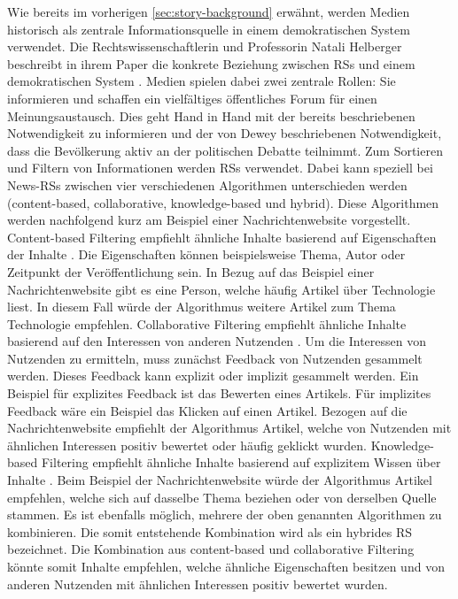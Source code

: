 Wie bereits im vorherigen \autoref{sec:story-background} erwähnt, werden Medien historisch als zentrale Informationsquelle in einem demokratischen System verwendet.
Die Rechtswissenschaftlerin und Professorin Natali Helberger beschreibt in ihrem Paper die konkrete Beziehung zwischen \acp{RS} und einem demokratischen System \cite{democratic-role}.
Medien spielen dabei zwei zentrale Rollen: Sie informieren und schaffen ein vielfältiges öffentliches Forum für einen Meinungsaustausch.
Dies geht Hand in Hand mit der bereits beschriebenen Notwendigkeit zu informieren und der von Dewey beschriebenen Notwendigkeit, dass die Bevölkerung aktiv an der politischen Debatte teilnimmt.
Zum Sortieren und Filtern von Informationen werden \acp{RS} verwendet.
Dabei kann speziell bei News-\acp{RS} zwischen vier verschiedenen Algorithmen unterschieden werden (content-based, collaborative, knowledge-based und hybrid).
Diese Algorithmen werden nachfolgend kurz am Beispiel einer Nachrichtenwebsite vorgestellt. \\

Content-based Filtering empfiehlt ähnliche Inhalte basierend auf Eigenschaften der Inhalte \cite{content-based-rs}.
Die Eigenschaften können beispielsweise Thema, Autor oder Zeitpunkt der Veröffentlichung sein.
In Bezug auf das Beispiel einer Nachrichtenwebsite gibt es eine Person, welche häufig Artikel über Technologie liest.
In diesem Fall würde der Algorithmus weitere Artikel zum Thema Technologie empfehlen.
Collaborative Filtering empfiehlt ähnliche Inhalte basierend auf den Interessen von anderen Nutzenden \cite{collaborative-filtering-rs}.
Um die Interessen von Nutzenden zu ermitteln, muss zunächst Feedback von Nutzenden gesammelt werden.
Dieses Feedback kann explizit oder implizit gesammelt werden.
Ein Beispiel für explizites Feedback ist das Bewerten eines Artikels.
Für implizites Feedback wäre ein Beispiel das Klicken auf einen Artikel.
Bezogen auf die Nachrichtenwebsite empfiehlt der Algorithmus Artikel, welche von Nutzenden mit ähnlichen Interessen positiv bewertet oder häufig geklickt wurden.
Knowledge-based Filtering empfiehlt ähnliche Inhalte basierend auf explizitem Wissen über Inhalte \cite{knowledge-based-rs}.
Beim Beispiel der Nachrichtenwebsite würde der Algorithmus Artikel empfehlen, welche sich auf dasselbe Thema beziehen oder von derselben Quelle stammen.
Es ist ebenfalls möglich, mehrere der oben genannten Algorithmen zu kombinieren.
Die somit entstehende Kombination wird als ein hybrides \ac{RS} bezeichnet.
Die Kombination aus content-based und collaborative Filtering könnte somit Inhalte empfehlen, welche ähnliche Eigenschaften besitzen und von anderen Nutzenden mit ähnlichen Interessen positiv bewertet wurden.\\

